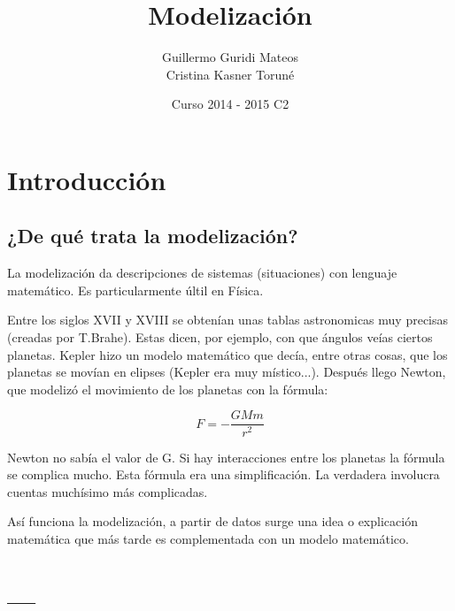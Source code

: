 \documentclass{apuntes}
\title{Modelización}
\author{Guillermo Guridi Mateos\\Cristina Kasner Toruné}
\date{Curso 2014 - 2015 C2}
\begin{document}
\pagestyle{plain}
\maketitle

\tableofcontents
\newpage

\chapter{Introducción}

\section{¿De qué trata la modelización?}

La modelización da descripciones de sistemas (situaciones) con lenguaje matemático. Es particularmente últil en Física.

Entre los siglos XVII y XVIII se obtenían unas tablas astronomicas muy precisas (creadas por T.Brahe). Estas dicen, por ejemplo, con que ángulos veías ciertos planetas.
Kepler hizo un modelo matemático que decía, entre otras cosas, que los planetas se movían en elipses (Kepler era muy místico...). Después llego Newton, que modelizó el movimiento de los planetas con la fórmula:

$$F = - \frac{GMm}{r^2}$$

Newton no sabía el valor de G. Si hay interacciones entre los planetas la fórmula se complica mucho. Esta fórmula era una simplificación. La verdadera involucra cuentas muchísimo más complicadas.

Así funciona la modelización, a partir de datos surge una idea o explicación matemática que más tarde es complementada con un modelo matemático.




\appendix

\chapter{---}

\printindex
\end{document}
